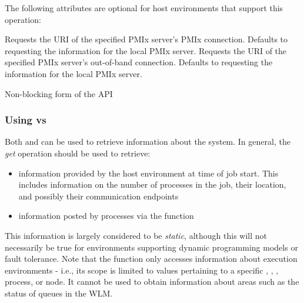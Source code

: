 \optattrstart
The following attributes are optional for host environments that support this operation:

 Requests the URI of the specified \ac{PMIx} server's \ac{PMIx} connection. Defaults to requesting the information for the local \ac{PMIx} server.
\pastePRRTEAttributeItemEnd
{} Requests the URI of the specified \ac{PMIx} server's out-of-band connection. Defaults to requesting the information for the local \ac{PMIx} server.
\pastePRRTEAttributeItemEnd

\optattrend

\descr

Non-blocking form of the  \ac{API}


\subsubsection{Using  vs }
\label{chap:api_job_mgmt:query}

Both  and  can be used to retrieve information about the system. In general, the \emph{get} operation should be used to retrieve:

\begin{itemize}
\item information provided by the host environment at time of job start. This includes information on the number of processes in the job, their location, and possibly their communication endpoints
\item information posted by processes via the  function
\end{itemize}

This information is largely considered to be \emph{static}, although this will not necessarily be true for environments supporting dynamic programming models or fault tolerance. Note that the  function only accesses information about execution environments - i.e., its scope is limited to values pertaining to a specific , , , process, or node. It cannot be used to obtain information about areas such as the status of queues in the \ac{WLM}.

